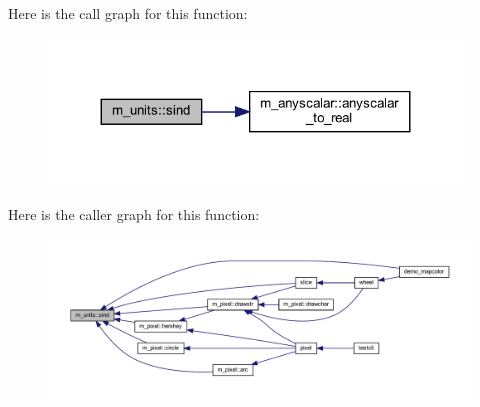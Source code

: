Here is the call graph for this function\+:
\nopagebreak
\begin{figure}[H]
\begin{center}
\leavevmode
\includegraphics[width=311pt]{namespacem__units_afe7f79e1832a71630c0f83602a309aef_cgraph}
\end{center}
\end{figure}
Here is the caller graph for this function\+:
\nopagebreak
\begin{figure}[H]
\begin{center}
\leavevmode
\includegraphics[width=350pt]{namespacem__units_afe7f79e1832a71630c0f83602a309aef_icgraph}
\end{center}
\end{figure}
\mbox{\label{namespacem__units_ae79705192f0982ec3a091c4df260dfcd}} 
